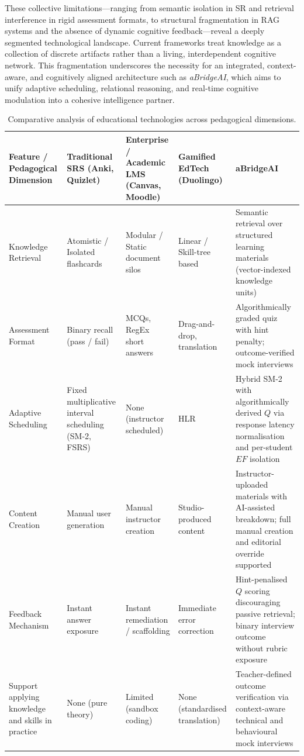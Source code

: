 These collective limitations—ranging from semantic isolation in SR and retrieval interference in rigid assessment formats, to structural fragmentation in RAG systems and the absence of dynamic cognitive feedback—reveal a deeply segmented technological landscape. Current frameworks treat knowledge as a collection of discrete artifacts rather than a living, interdependent cognitive network. This fragmentation underscores the necessity for an integrated, context-aware, and cognitively aligned architecture such as \textit{aBridgeAI}, which aims to unify adaptive scheduling, relational reasoning, and real-time cognitive modulation into a cohesive intelligence partner.

\begin{table}[H]
\centering
\small
\renewcommand{\arraystretch}{1.4}
\caption{Comparative analysis of educational technologies across 
pedagogical dimensions.}
\begin{tabular}{|p{2.5cm}|p{2.5cm}|p{3cm}|p{3cm}|p{4cm}|}
\hline
\textbf{Feature / Pedagogical Dimension} &
\textbf{Traditional SRS (Anki, Quizlet)} \cite{anki, quizlet} &
\textbf{Enterprise / Academic LMS (Canvas, Moodle)} \cite{canvas, moodle} &
\textbf{Gamified EdTech (Duolingo)} \cite{duolingo} &
\textbf{aBridgeAI} \\
\hline
Knowledge Retrieval &
Atomistic / Isolated flashcards &
Modular / Static document silos &
Linear / Skill-tree based &
Semantic retrieval over structured learning materials 
(vector-indexed knowledge units) \\
\hline
Assessment Format &
Binary recall (pass / fail) &
MCQs, RegEx short answers &
Drag-and-drop, translation &
Algorithmically graded quiz with hint penalty; 
outcome-verified mock interviews \\
\hline
Adaptive Scheduling &
Fixed multiplicative interval scheduling (SM-2, FSRS) &
None (instructor scheduled) &
HLR &
Hybrid SM-2 with algorithmically derived $Q$ via 
response latency normalisation and per-student 
$EF$ isolation \\
\hline
Content Creation &
Manual user generation &
Manual instructor creation &
Studio-produced content &
Instructor-uploaded materials with AI-assisted 
breakdown; full manual creation and 
editorial override supported \\
\hline
Feedback Mechanism &
Instant answer exposure &
Instant remediation / scaffolding &
Immediate error correction &
Hint-penalised $Q$ scoring discouraging passive 
retrieval; binary interview outcome without 
rubric exposure \\
\hline
Support applying knowledge and skills in practice &
None (pure theory) &
Limited (sandbox coding) &
None (standardised translation) &
Teacher-defined outcome verification via 
context-aware technical and behavioural 
mock interviews \\
\hline
\end{tabular}
\label{tab:edtech_comparison}
\end{table}